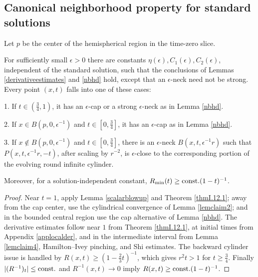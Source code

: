 \subsection{Canonical neighborhood property for standard solutions}
\label{secclaim5}

Let $p$ be the center of the hemispherical region in the time-zero slice.

\begin{lemma}
  \label{lem:kl-canonical-neighborhood-property-standard-solutions-existence-canonical-neighborhoods}
 \label{claim5}
For sufficiently small $\epsilon>0$ there are constants
$\eta(\epsilon),C_1(\epsilon),C_2(\epsilon)$, independent of the standard
solution, such that the conclusions of Lemmas \ref{derivativeestimates} and
\ref{nbhd} hold, except that an $\epsilon$-neck need not be strong. Every
point $(x,t)$ falls into one of these cases:

1. If $t\in(\frac34,1)$, it has an $\epsilon$-cap or a strong
$\epsilon$-neck as in Lemma \ref{nbhd}.

2. If $x\in B(p,0,\epsilon^{-1})$ and $t\in[0,\frac34]$, it has an
$\epsilon$-cap as in Lemma \ref{nbhd}.

3. If $x\notin B(p,0,\epsilon^{-1})$ and $t\in[0,\frac34]$, there is an
$\epsilon$-neck $B(x,t,\epsilon^{-1}r)$ such that
$P(x,t,\epsilon^{-1}r,-t)$, after scaling by $r^{-2}$, is
$\epsilon$-close to the corresponding portion of the evolving round infinite
cylinder.

Moreover, for a solution-independent constant,
$R_{\min}(t)\geq\operatorname{const.}(1-t)^{-1}$.
\end{lemma}
\begin{proof}
\sketch Near $t=1$, apply Lemma \ref{scalarblowup} and Theorem
\ref{thmI.12.1}; away from the cap center, use the cylindrical convergence of
Lemma \ref{lemclaim2}; and in the bounded central region use the cap alternative
of Lemma \ref{nbhd}. The derivative estimates follow near $1$ from Theorem
\ref{thmI.12.1}, at initial times from Appendix \ref{applocalder}, and in the
intermediate interval from Lemma \ref{lemclaim4}, Hamilton--Ivey pinching, and
Shi estimates. The backward cylinder issue is handled by
$R(x,t)\geq(1-\frac23t)^{-1}$, which gives $r^2t>1$ for $t\geq\frac34$.
Finally $|(R^{-1})_t|\leq\operatorname{const.}$ and $R^{-1}(x,t)\to0$ imply
$R(x,t)\geq\operatorname{const.}(1-t)^{-1}$.
\end{proof}

